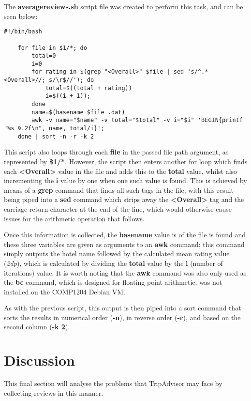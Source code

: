 \documentclass{article}
\begin{document}
	\noindent
	The \textbf{averagereviews.sh} script file was created to perform this task, and can be seen below:
	
	\begin{lstlisting}[caption={averagereviews.sh}, captionpos=b]
	#!/bin/bash

	for file in $1/*; do
		total=0
		i=0
		for rating in $(grep "<Overall>" $file | sed 's/^.*<Overall>//; s/\r$//'); do
			total=$((total + rating))
			i=$((i + 1));
		done
		name=$(basename $file .dat)
		awk -v name="$name" -v total="$total" -v i="$i" 'BEGIN{printf "%s %.2f\n", name, total/i}';
	done | sort -n -r -k 2
	\end{lstlisting}
	
	\noindent
	This script also loops through each \textbf{file} in the passed file path argument, as represented by \textbf{\$1/*}. However, the script then enters another for loop which finds each \textbf{{\textless}Overall\textgreater} value in the file and adds this to the \textbf{total} value, whilst also incrementing the \textbf{i} value by one when one such value is found. This is achieved by means of a \textbf{grep} command that finds all such tags in the file, with this result being piped into a \textbf{sed} command which strips away the \textbf{{\textless}Overall\textgreater} tag and the carriage return character at the end of the line, which would otherwise cause issues for the arithmetic operation that follows. \newline
	
	\noindent
	Once this information is collected, the \textbf{basename} value is of the file is found and these three variables are given as arguments to an \textbf{awk} command; this command simply outputs the hotel name followed by the calculated mean rating value (\textit{2dp}), which is calculated by dividing the \textbf{total} value by the \textbf{i} (number of iterations) value. It is worth noting that the \textbf{awk} command was also only used as the \textbf{bc} command, which is designed for floating point arithmetic, was not installed on the COMP1204 Debian VM. \newline
	
	\noindent
	As with the previous script, this output is then piped into a sort command that sorts the results in numerical order (\textbf{-n}), in reverse order (\textbf{-r}), and based on the second column (\textbf{-k 2}).
	
	\newpage
	\section{Discussion}
	This final section will analyse the problems that TripAdvisor may face by collecting reviews in this manner. \newline
	
\end{document}
